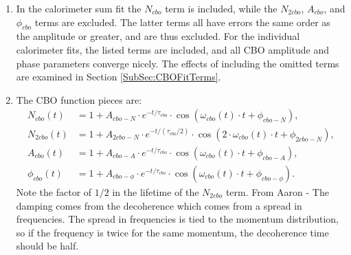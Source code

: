 \begin{enumerate}
		\item{In the calorimeter sum fit the $N_{cbo}$ term is included, while the $N_{2cbo}$, $A_{cbo}$, and $\phi_{cbo}$ terms are excluded. The latter terms all have errors the same order as the amplitude or greater, and are thus excluded. For the individual calorimeter fits, the listed terms are included, and all CBO amplitude and phase parameters converge nicely. The effects of including the omitted terms are examined in Section \ref{SubSec:CBOFitTerms}.}
		\item{The CBO function pieces are:
			\begin{equation}
			\begin{aligned}
					N_{cbo}(t) &= 1 + A_{cbo-N} \cdot e^{-t/\tau_{cbo}} \cdot \cos(\omega_{cbo}(t) \cdot t + \phi_{cbo-N}), \\
					N_{2cbo}(t) &= 1 + A_{2cbo-N} \cdot e^{-t/(\tau_{cbo}/2)} \cdot \cos(2 \cdot \omega_{cbo}(t) \cdot t + \phi_{2cbo-N}), \\
					A_{cbo}(t) &= 1 + A_{cbo-A} \cdot e^{-t/\tau_{cbo}} \cdot \cos(\omega_{cbo}(t) \cdot t + \phi_{cbo-A}), \\
					\phi_{cbo}(t) &= 1 + A_{cbo-\phi} \cdot e^{-t/\tau_{cbo}} \cdot \cos(\omega_{cbo}(t) \cdot t + \phi_{cbo-\phi}).
			\label{eqn:CBO}
			\end{aligned}
			\end{equation}
		Note the factor of $1/2$ in the lifetime of the $N_{2cbo}$ term. From Aaron - The damping comes from the decoherence which comes from a spread in frequencies. The spread in frequencies is tied to the momentum distribution, so if the frequency is twice for the same momentum, the decoherence time should be half.
		}
	\end{enumerate}

